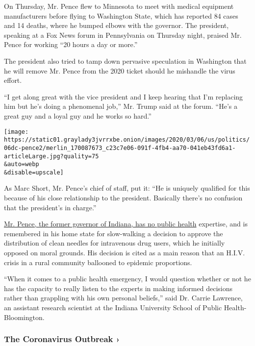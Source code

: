 On Thursday, Mr. Pence flew to Minnesota to meet with medical equipment
manufacturers before flying to Washington State, which has reported 84
cases and 14 deaths, where he bumped elbows with the governor. The
president, speaking at a Fox News forum in Pennsylvania on Thursday
night, praised Mr. Pence for working ``20 hours a day or more.''

The president also tried to tamp down pervasive speculation in
Washington that he will remove Mr. Pence from the 2020 ticket should he
mishandle the virus effort.

``I get along great with the vice president and I keep hearing that I'm
replacing him but he's doing a phenomenal job,'' Mr. Trump said at the
forum. ``He's a great guy and a loyal guy and he works so hard.''

\texttt{[image: https://static01.graylady3jvrrxbe.onion/images/2020/03/06/us/politics/06dc-pence2/merlin\_170087673\_c23c7e06-091f-4fb4-aa70-041eb43fd6a1-articleLarge.jpg?quality=75\\\&auto=webp\\\&disable=upscale]}

As Marc Short, Mr. Pence's chief of staff, put it: ``He is uniquely
qualified for this because of his close relationship to the president.
Basically there's no confusion that the president's in charge.''

\href{https://www.nytimes3xbfgragh.onion/2020/03/03/us/politics/trump-us-coronavirus.html}{Mr.
Pence, the former governor of Indiana, has no public health} expertise,
and is remembered in his home state for slow-walking a decision to
approve the distribution of clean needles for intravenous drug users,
which he initially opposed on moral grounds. His decision is cited as a
main reason that an H.I.V. crisis in a rural community ballooned to
epidemic proportions.

``When it comes to a public health emergency, I would question whether
or not he has the capacity to really listen to the experts in making
informed decisions rather than grappling with his own personal
beliefs,'' said Dr. Carrie Lawrence, an assistant research scientist at
the Indiana University School of Public Health-Bloomington.

\href{https://www.nytimes3xbfgragh.onion/news-event/coronavirus?action=click\&pgtype=Article\&state=default\&region=MAIN_CONTENT_3\&context=storylines_faq}{}

\hypertarget{the-coronavirus-outbreak-}{%
\subsubsection{The Coronavirus Outbreak
›}\label{the-coronavirus-outbreak-}}

